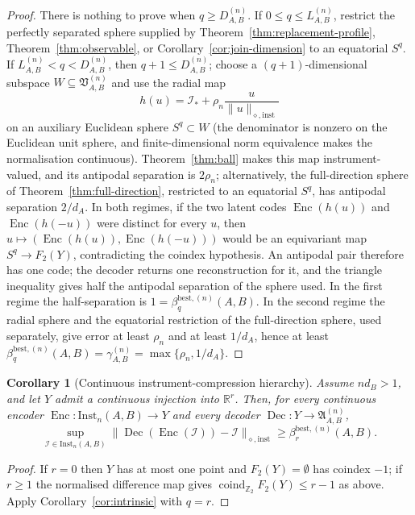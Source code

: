 \documentclass[11pt,a4paper]{article}
\newtheorem{corollary}[theorem]{Corollary}
\newcommand{\Inst}{\mathrm{Inst}}
\newcommand{\coind}{\operatorname{coind}_{\mathbb Z_2}}
\begin{document}
\begin{proof}
There is nothing to prove when $q\ge D_{A,B}^{(n)}$. If $0\le q\le L_{A,B}^{(n)}$, restrict the perfectly separated sphere supplied by Theorem~\ref{thm:replacement-profile}, Theorem~\ref{thm:observable}, or Corollary~\ref{cor:join-dimension} to an equatorial $S^q$. If $L_{A,B}^{(n)}<q<D_{A,B}^{(n)}$, then $q+1\le D_{A,B}^{(n)}$; choose a $(q+1)$-dimensional subspace $W\subseteq\mathfrak V_{A,B}^{(n)}$ and use the radial map
\[
h(u)=\mathcal I_*+\rho_n\frac{u}{\|u\|_{\diamond,\mathrm{inst}}}
\]
on an auxiliary Euclidean sphere $S^q\subset W$ (the denominator is nonzero on the Euclidean unit sphere, and finite-dimensional norm equivalence makes the normalisation continuous). Theorem~\ref{thm:ball} makes this map instrument-valued, and its antipodal separation is $2\rho_n$; alternatively, the full-direction sphere of Theorem~\ref{thm:full-direction}, restricted to an equatorial $S^q$, has antipodal separation $2/d_A$. In both regimes, if the two latent codes $\operatorname{Enc}(h(u))$ and $\operatorname{Enc}(h(-u))$ were distinct for every $u$, then $u\mapsto(\operatorname{Enc}(h(u)),\operatorname{Enc}(h(-u)))$ would be an equivariant map $S^q\to F_2(Y)$, contradicting the coindex hypothesis. An antipodal pair therefore has one code; the decoder returns one reconstruction for it, and the triangle inequality gives half the antipodal separation of the sphere used. In the first regime the half-separation is $1=\beta_q^{\mathrm{best},(n)}(A,B)$. In the second regime the radial sphere and the equatorial restriction of the full-direction sphere, used separately, give error at least $\rho_n$ and at least $1/d_A$, hence at least $\beta_q^{\mathrm{best},(n)}(A,B)=\gamma_{A,B}^{(n)}=\max\{\rho_n,1/d_A\}$.
\end{proof}

\begin{corollary}[Continuous instrument-compression hierarchy]
\label{cor:euclidean}
Assume $nd_B>1$, and let $Y$ admit a continuous injection into $\mathbb R^r$. Then, for every continuous encoder $\operatorname{Enc}:\Inst_n(A,B)\to Y$ and every decoder $\operatorname{Dec}:Y\to\mathfrak A_{A,B}^{(n)}$,
\[
\sup_{\mathcal I\in\Inst_n(A,B)}
\|\operatorname{Dec}(\operatorname{Enc}(\mathcal I))-\mathcal I\|_{\diamond,\mathrm{inst}}
\ge\beta_r^{\mathrm{best},(n)}(A,B).
\]
\end{corollary}

\begin{proof}
If $r=0$ then $Y$ has at most one point and $F_2(Y)=\emptyset$ has coindex $-1$; if $r\ge1$ the normalised difference map gives $\coind F_2(Y)\le r-1$ as above. Apply Corollary~\ref{cor:intrinsic} with $q=r$.
\end{proof}
\end{document}
